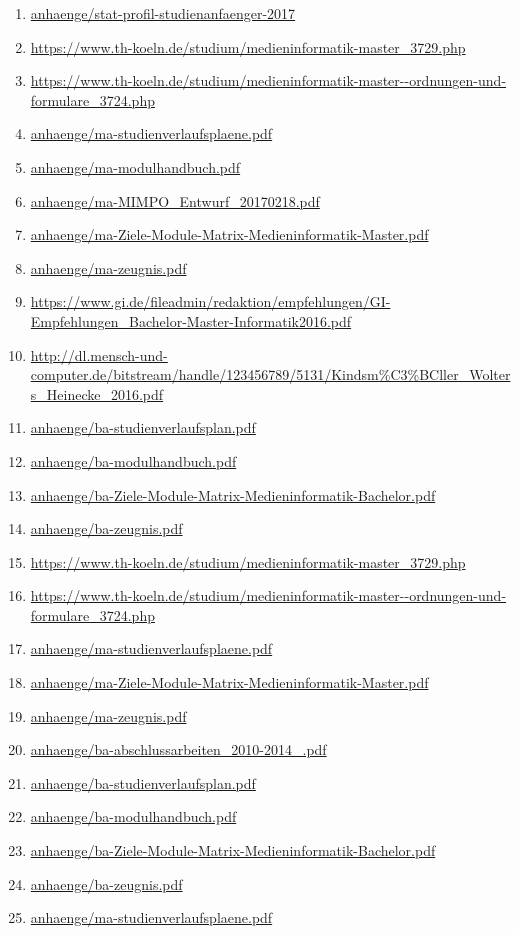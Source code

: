 \documentclass[BCOR12mm,DIV11,titlepage,a4paper,oneside,10pt]{scrbook}
\begin{document}
\begin{sloppypar}
\begin{flushleft}
\begin{enumerate}
\item{\url{anhaenge/stat-profil-studienanfaenger-2017}} 
\item{\url{https://www.th-koeln.de/studium/medieninformatik-master\_3729.php}} 
\item{\url{https://www.th-koeln.de/studium/medieninformatik-master--ordnungen-und-formulare\_3724.php}} 
\item{\url{anhaenge/ma-studienverlaufsplaene.pdf}} 
\item{\url{anhaenge/ma-modulhandbuch.pdf}} 
\item{\url{anhaenge/ma-MIMPO\_Entwurf\_20170218.pdf}} 
\item{\url{anhaenge/ma-Ziele-Module-Matrix-Medieninformatik-Master.pdf}} 
\item{\url{anhaenge/ma-zeugnis.pdf}} 
\item{\url{https://www.gi.de/fileadmin/redaktion/empfehlungen/GI-Empfehlungen\_Bachelor-Master-Informatik2016.pdf}} 
\item{\url{http://dl.mensch-und-computer.de/bitstream/handle/123456789/5131/Kindsm\%C3\%BCller\_Wolters\_Heinecke\_2016.pdf}} 
\item{\url{anhaenge/ba-studienverlaufsplan.pdf}} 
\item{\url{anhaenge/ba-modulhandbuch.pdf}} 
\item{\url{anhaenge/ba-Ziele-Module-Matrix-Medieninformatik-Bachelor.pdf}} 
\item{\url{anhaenge/ba-zeugnis.pdf}} 
\item{\url{https://www.th-koeln.de/studium/medieninformatik-master\_3729.php}} 
\item{\url{https://www.th-koeln.de/studium/medieninformatik-master--ordnungen-und-formulare\_3724.php}} 
\item{\url{anhaenge/ma-studienverlaufsplaene.pdf}} 
\item{\url{anhaenge/ma-Ziele-Module-Matrix-Medieninformatik-Master.pdf}} 
\item{\url{anhaenge/ma-zeugnis.pdf}} 
\item{\url{anhaenge/ba-abschlussarbeiten\_2010-2014\_.pdf}} 
\item{\url{anhaenge/ba-studienverlaufsplan.pdf}} 
\item{\url{anhaenge/ba-modulhandbuch.pdf}} 
\item{\url{anhaenge/ba-Ziele-Module-Matrix-Medieninformatik-Bachelor.pdf}} 
\item{\url{anhaenge/ba-zeugnis.pdf}} 
\item{\url{anhaenge/ma-studienverlaufsplaene.pdf}} 

\end{enumerate}
\end{flushleft}
\end{sloppypar}
\end{document}

